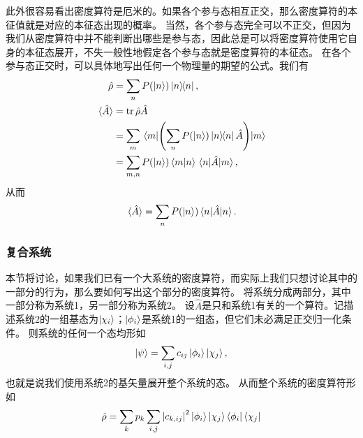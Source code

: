 \documentclass[hyperref, UTF8, a4paper]{ctexart}
\begin{document}
此外很容易看出密度算符是厄米的。如果各个参与态相互正交，那么密度算符的本征值就是对应的本征态出现的概率。
当然，各个参与态完全可以不正交，但因为我们从密度算符中并不能判断出哪些是参与态，因此总是可以将密度算符使用它自身的本征态展开，不失一般性地假定各个参与态就是密度算符的本征态。
在各个参与态正交时，可以具体地写出任何一个物理量的期望的公式。我们有
\[
    \begin{aligned}
        \hat{\rho} &= \sum_n P(\ket{n}) \dyad{n}, \\
        \expval*{\hat{A}} &= \trace \hat{\rho} \hat{A} \\
        &= \sum_m \mel{m}{\left(\sum_n P(\ket{n}) \dyad{n} \hat{A} \right)}{m} \\
        &= \sum_{m, n} P(\ket{n}) \braket{m}{n} \mel{n}{\hat{A}}{m}, 
    \end{aligned}
\]
从而
\begin{equation}
    \expval*{\hat{A}} = \sum_n P(\ket{n}) \mel{n}{\hat{A}}{n}.
\end{equation}

\subsubsection{复合系统}

本节将讨论，如果我们已有一个大系统的密度算符，而实际上我们只想讨论其中的一部分的行为，那么要如何写出这个部分的密度算符。
将系统分成两部分，其中一部分称为系统1，另一部分称为系统2。
设$\hat{A}$是只和系统1有关的一个算符。记描述系统2的一组基态为$\ket{\chi_i}$；$\ket{\phi_i}$是系统1的一组态，但它们未必满足正交归一化条件。
则系统的任何一个态均形如
\[
    \ket{\psi} = \sum_{i, j} c_{ij} \ket{\phi_i} \ket{\chi_j},
\]
也就是说我们使用系统2的基矢量展开整个系统的态。
从而整个系统的密度算符形如
\[
    \hat{\rho} = \sum_k p_k \sum_{i,j} \abs{c_{k,ij}}^2 \ket{\phi_i} \ket{\chi_j} \bra{\phi_i} \bra{\chi_j}
\]
\end{document}
